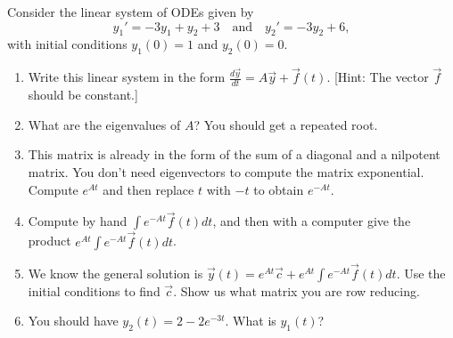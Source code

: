 \begin{problem} 
Consider the linear system of ODEs given by 
$$y_1' = -3y_1 + y_2 +3\quad \text{and}\quad y_2' = -3y_2+6,$$
with initial conditions $y_1(0)=1$ and $y_2(0)=0$. 
\begin{enumerate}
 \item Write this linear system in the form $\frac{d\vec y}{dt} =A\vec y + \vec f(t)$. [Hint: The vector $\vec f$ should be constant.]
 \item What are the eigenvalues of $A$? You should get a repeated root.
 \item 
{}%
This matrix is already in the form of the sum of a diagonal and a nilpotent matrix.  You don't need eigenvectors to compute the matrix exponential. Compute $e^{At}$ and then replace $t$ with $-t$ to obtain $e^{-At}$.
 \item 
{}
%
Compute by hand $\int e^{-At}\vec f(t) dt$, and then with a computer give the product $e^{At}\int e^{-At}\vec f(t) dt$. 
 \item We know the general solution is $\vec y(t) = e^{At}\vec c + e^{At}\int e^{-At}\vec f(t) dt.$  Use the initial conditions to find $\vec c$. Show us what matrix you are row reducing. 
 \item You should have ${y_2}(t)=2-2 e^{-3 t}$.  What is ${y_1}(t)$?
\end{enumerate}
\end{problem}







